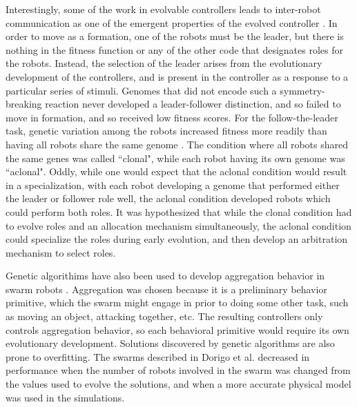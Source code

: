 \documentclass[]{article}
\begin{document}
Interestingly, some of the work in evolvable controllers leads to inter-robot communication as one of the emergent properties of the evolved controller \cite{quinn2001evolving}.
In order to move as a formation, one of the robots must be the leader, but there is nothing in the fitness function or any of the other code that designates roles for the robots. 
Instead, the selection of the leader arises from the evolutionary development of the controllers, and is present in the controller as a response to a particular series of stimuli. 
Genomes that did not encode such a symmetry-breaking reaction never developed a leader-follower distinction, and so failed to move in formation, and so received low fitness scores. 
For the follow-the-leader task, genetic variation among the robots increased fitness more readily than having all robots share the same genome \cite{quinn2001comparison}.
The condition where all robots shared the same genes was called ``clonal", while each robot having its own genome was ``aclonal".
Oddly, while one would expect that the aclonal condition would result in a specialization, with each robot developing a genome that performed either the leader or follower role well, the aclonal condition developed robots which could perform both roles. 
It was hypothesized that while the clonal condition had to evolve roles and an allocation mechanism simultaneously, the aclonal condition could specialize the roles during early evolution, and then develop an arbitration mechanism to select roles.

Genetic algorithims have also been used to develop aggregation behavior in swarm robots \cite{bahgecci2005evolving, dorigo2004evolving}.  
Aggregation was chosen because it is a preliminary behavior primitive, which the swarm might engage in prior to doing some other task, such as moving an object, attacking together, etc.
The resulting controllers only controls aggregation behavior, so each behavioral primitive would require its own evolutionary development. 
Solutions discovered by genetic algorithms are also prone to overfitting. 
The swarms described in Dorigo et al. decreased in performance when the number of robots involved in the swarm was changed from the values used to evolve the solutions, and when a more accurate physical model was used in the simulations.
\end{document}
